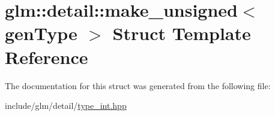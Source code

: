 \hypertarget{structglm_1_1detail_1_1make__unsigned}{}\section{glm\+:\+:detail\+:\+:make\+\_\+unsigned$<$ gen\+Type $>$ Struct Template Reference}
\label{structglm_1_1detail_1_1make__unsigned}


The documentation for this struct was generated from the following file\+:\begin{DoxyCompactItemize}
\item 
include/glm/detail/\hyperlink{type__int_8hpp}{type\+\_\+int.\+hpp}\end{DoxyCompactItemize}
